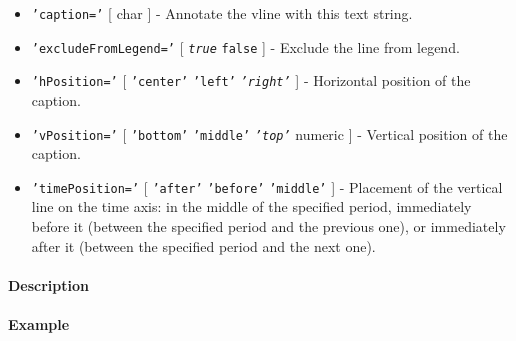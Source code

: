  \begin{itemize}
 \item
   \texttt{'caption='} {[} char {]} - Annotate the vline with this text
   string.
 \item
   \texttt{'excludeFromLegend='} {[} \emph{\texttt{true}} \textbar{}
   \texttt{false} {]} - Exclude the line from legend.
 \item
   \texttt{'hPosition='} {[} \texttt{'center'} \textbar{} \texttt{'left'}
   \textbar{} \emph{\texttt{'right'}} {]} - Horizontal position of the
   caption.
 \item
   \texttt{'vPosition='} {[} \texttt{'bottom'} \textbar{}
   \texttt{'middle'} \textbar{} \emph{\texttt{'top'}} \textbar{} numeric
   {]} - Vertical position of the caption.
 \item
   \texttt{'timePosition='} {[} \texttt{'after'} \textbar{}
   \texttt{'before'} \textbar{} \texttt{'middle'} {]} - Placement of the
   vertical line on the time axis: in the middle of the specified period,
   immediately before it (between the specified period and the previous
   one), or immediately after it (between the specified period and the
   next one).
 \end{itemize}
 
 \paragraph{Description}
 
 \paragraph{Example}


